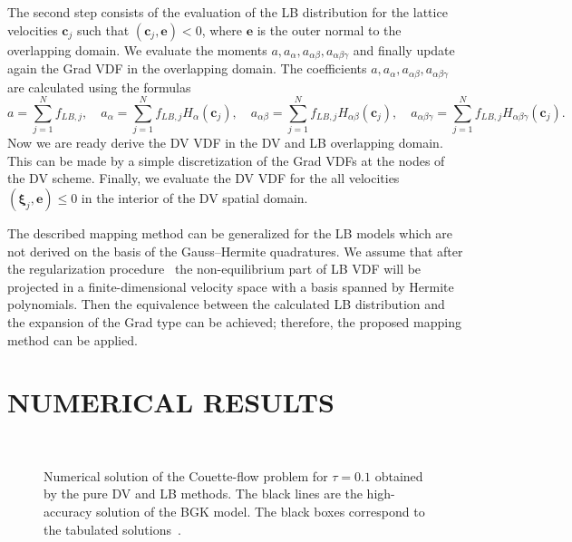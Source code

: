 \documentclass{aip-cp}
\makeatletter
\newenvironment{subfigures}
 {\begin{minipage}{\columnwidth}\def\@captype{figure}\centering}
 {\end{minipage}}
\newcommand{\bxi}{\boldsymbol{\xi}}
\newcommand{\bc}{\boldsymbol{c}}
\makeatother
\begin{document}
The second step consists of the evaluation of the LB distribution for the lattice velocities $\boldsymbol{c}_j$
such that $(\boldsymbol{c}_j,\mathbf{e})<0$, where $\mathbf{e}$ is the outer normal to the overlapping domain.
We evaluate the moments $a, a_{\alpha}, a_{\alpha\beta}, a_{\alpha\beta\gamma}$
and finally update again the Grad VDF in the overlapping domain.
The coefficients $a, a_{\alpha}, a_{\alpha\beta}, a_{\alpha\beta\gamma}$ are calculated using the formulas
$$
a=\sum_{j=1}^N f_{LB,j}, \quad a_{\alpha}=\sum_{j=1}^N f_{LB,j}H_{\alpha}(\bc_j), \quad a_{\alpha\beta}=\sum_{j=1}^N f_{LB,j}H_{\alpha\beta}(\bc_j),
\quad a_{\alpha\beta\gamma}=\sum_{j=1}^N f_{LB,j}H_{\alpha\beta\gamma}(\bc_j).
$$
Now we are ready derive the DV VDF in the DV and LB overlapping domain. This can be made by a simple
discretization of the Grad VDFs at the nodes of the DV scheme. Finally, we evaluate the DV VDF for the all velocities $(\bxi_j,\mathbf{e}) \leq 0$
in the interior of the DV spatial domain.

The described mapping method can be generalized for the LB models which are not derived on the basis of the Gauss--Hermite quadratures.
We assume that after the regularization procedure~\cite{Latt2006, Chen2006}
the non-equilibrium part of LB VDF will be projected in a finite-dimensional velocity space with a basis spanned by Hermite polynomials.
Then the equivalence between the calculated LB distribution and
the expansion of the Grad type can be achieved; therefore, the proposed mapping method can be applied.

\section{NUMERICAL RESULTS}\label{sec:results}

\begin{figure}
    \begin{subfigures}
    \centering
    \subfloat[][LB method: D3Q19]{%
        \texttt{[image: d3q19]}}\\
    \subfloat[][LB method: D3Q121]{%
        \texttt{[image: d3q121]}}%
    \subfloat[][LB method: D3Q96]{%
        \texttt{[image: d3v96]}}
    \end{subfigures}
    \caption{
        Numerical solution of the Couette-flow problem for $\tau=0.1$ obtained by the pure DV and LB methods.
        The black lines are the high-accuracy solution of the BGK model.
        The black boxes correspond to the tabulated solutions~\cite{Luo2015, Luo2016}.
    }\label{fig:pure}
\end{figure}
\end{document}
